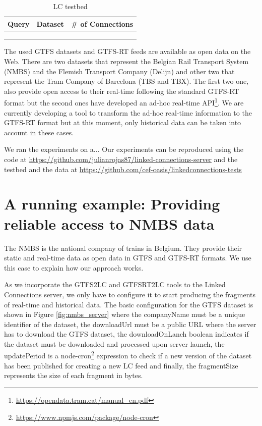 \documentclass[sw]{iosart2x}
\begin{document}
\begin{table} %
\centering
\label{table:queries}
\begin{tabular}{lll}
\hline
\multicolumn{1}{l|}{\textbf{Query}} & \multicolumn{1}{l|}{\textbf{Dataset}} & \multicolumn{1}{l}{\textbf{\# of Connections}} \\ \hline
                            &                              &                                    \\
                            &                              &                                    \\
                            &                              &                                   
\end{tabular}
\caption{LC testbed} 
\end{table}

The used GTFS datasets and GTFS-RT feeds are available as open data on the Web. There are two datasets that represent the Belgian Rail Transport System (NMBS) and the Flemish Transport Company (Delijn) and other two that represent the Tram Company of Barcelona (TBS and TBX). The first two one, also provide open access to their real-time following the standard GTFS-RT format but the second ones have developed an ad-hoc real-time API\footnote{\url{https://opendata.tram.cat/manual_en.pdf}}. We are currently developing a tool to transform the ad-hoc real-time information to the GTFS-RT format but at this moment, only historical data can be taken into account in these cases.

We ran the experiments on a... Our experiments can be reproduced using the code at \url{https://github.com/julianrojas87/linked-connections-server} and the testbed and the data at \url{https://github.com/cef-oasis/linkedconnections-tests}

\section{A running example: Providing reliable access to NMBS data}
The NMBS is the national company of trains in Belgium. They provide their static and real-time data as open data in GTFS and GTFS-RT formats. We use this case to explain how our approach works.

As we incorporate the GTFS2LC and GTFSRT2LC tools to the Linked Connections server, we only have to configure it to start producing the fragments of real-time and historical data. The basic configuration for the GTFS dataset is shown in Figure \ref{fig:nmbs_server} where the companyName must be a unique identifier of the dataset, the downloadUrl must be a public URL where the server has to download the GTFS dataset, the downloadOnLanch boolean indicates if the dataset must be downloaded and processed upon server launch, the updatePeriod is a node-cron\footnote{\url{https://www.npmjs.com/package/node-cron}} expression to check if a new version of the dataset has been published for creating a new LC feed and finally, the fragmentSize  represents the size of each fragment in bytes.
\end{document}
